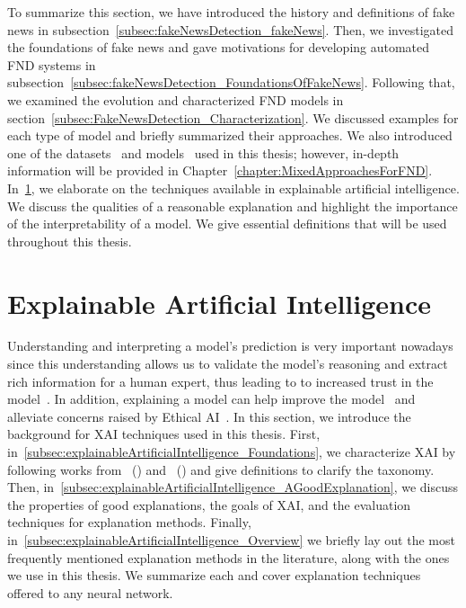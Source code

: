 To summarize this section, we have introduced the history and definitions of fake news in subsection~\ref{subsec:fakeNewsDetection_fakeNews}. Then, we investigated the foundations of fake news and gave motivations for developing automated FND systems in subsection~\ref{subsec:fakeNewsDetection_FoundationsOfFakeNews}. Following that, we examined the evolution and characterized FND models in section~\ref{subsec:FakeNewsDetection_Characterization}. We discussed examples for each type of model and briefly summarized their approaches. We also introduced one of the datasets~\parencite{UPFD_Dataset_Shu} and models~\parencite{GraphSAGE_Hamilton} used in this thesis; however, in-depth information will be provided in Chapter~\ref{chapter:MixedApproachesForFND}.\\
In~\ref{sec:explainableArtificialIntelligence}, we elaborate on the techniques available in explainable artificial intelligence. We discuss the qualities of a reasonable explanation and highlight the importance of the interpretability of a model. We give essential definitions that will be used throughout this thesis.

\section{Explainable Artificial Intelligence}
\label{sec:explainableArtificialIntelligence}
Understanding and interpreting a model's prediction is very important nowadays since this understanding allows us to validate the model's reasoning and extract rich information for a human expert, thus leading to to increased trust in the model~\parencite{WhyShouldITrustYou_Riberio}. In addition, explaining a model can help improve the model~\parencite{AUnifiedApproach_Lundberg} and alleviate concerns raised by Ethical AI~\parencite{MachineBias_Angwin, EURegulationsOnDecisionMaking_Goodman}.
In this section, we introduce the background for XAI techniques used in this thesis. First, in~\ref{subsec:explainableArtificialIntelligence_Foundations}, we characterize XAI by following works from~\citeauthor{TheMythosOfModelInterpretability_Lipton} (\citeyear{TheMythosOfModelInterpretability_Lipton}) and~\citeauthor{XAIConceptsTaxonomies_Arrieta} (\citeyear{XAIConceptsTaxonomies_Arrieta}) and give definitions to clarify the taxonomy. Then, in~\ref{subsec:explainableArtificialIntelligence_AGoodExplanation}, we discuss the properties of good explanations, the goals of XAI, and the evaluation techniques for explanation methods. Finally, in~\ref{subsec:explainableArtificialIntelligence_Overview} we briefly lay out the most frequently mentioned explanation methods in the literature, along with the ones we use in this thesis. We summarize each and cover explanation techniques offered to any  neural network.

